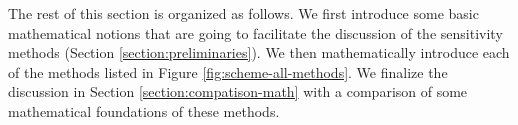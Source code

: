 The rest of this section is organized as follows. 
We first introduce some basic mathematical notions that are going to facilitate the discussion of the sensitivity methods (Section \ref{section:preliminaries}).
We then mathematically introduce each of the methods listed in Figure \ref{fig:scheme-all-methods}.
We finalize the discussion in Section \ref{section:compatison-math} with a comparison of some mathematical foundations of these methods. 
